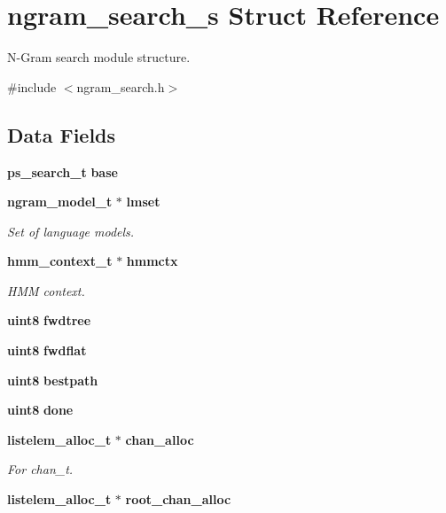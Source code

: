\section{ngram\-\_\-search\-\_\-s \-Struct \-Reference}
\label{structngram__search__s}


\-N-\/\-Gram search module structure.  




{\ttfamily \#include $<$ngram\-\_\-search.\-h$>$}

\subsection*{\-Data \-Fields}
\begin{DoxyCompactItemize}
\item 
{\bf ps\-\_\-search\-\_\-t} {\bfseries base}\label{structngram__search__s_a572ad45de5b0f364096f0a8544fe5bf7}

\item 
{\bf ngram\-\_\-model\-\_\-t} $\ast$ {\bf lmset}
\begin{DoxyCompactList}\small\item\em \-Set of language models. \end{DoxyCompactList}\item 
{\bf hmm\-\_\-context\-\_\-t} $\ast$ {\bf hmmctx}
\begin{DoxyCompactList}\small\item\em \-H\-M\-M context. \end{DoxyCompactList}\item 
{\bf uint8} {\bfseries fwdtree}\label{structngram__search__s_aca37c8278a0dacb881cc6a2b0953c076}

\item 
{\bf uint8} {\bfseries fwdflat}\label{structngram__search__s_a88358958f4f983c96034cbbd4bc8f5cd}

\item 
{\bf uint8} {\bfseries bestpath}\label{structngram__search__s_a0d1daeb151911b2243a1a91566be9063}

\item 
{\bf uint8} {\bfseries done}\label{structngram__search__s_a3c51a66cf26de3aa050b3615d14ff060}

\item 
{\bf listelem\-\_\-alloc\-\_\-t} $\ast$ {\bf chan\-\_\-alloc}\label{structngram__search__s_abe9fe60f6e48b9a6e3d41856bb1dc109}

\begin{DoxyCompactList}\small\item\em \-For chan\-\_\-t. \end{DoxyCompactList}\item 
{\bf listelem\-\_\-alloc\-\_\-t} $\ast$ {\bf root\-\_\-chan\-\_\-alloc}\label{structngram__search__s_a576470858bfa44c671f0e677902ab424}


\end{DoxyCompactItemize}

